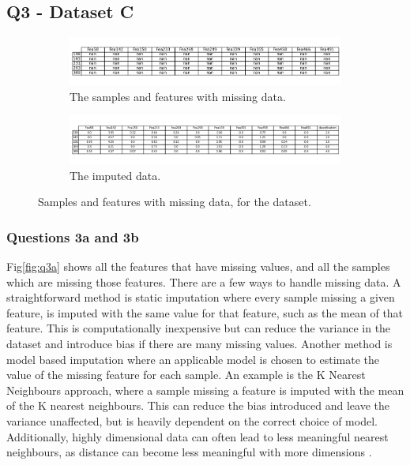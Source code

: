 
\subsection{Q3 - Dataset C}\label{subsec:dataset-c}
    \begin{figure}
    \centering
    \begin{subfigure}{0.9\textwidth}
        \centering
        \includegraphics[width=1\textwidth]{./figures/q3a}
        \caption{The samples and features with missing data.}
        \label{fig:q3a}
    \end{subfigure}%
    \hfill
    \begin{subfigure}{0.9\textwidth}
        \centering
        \includegraphics[width=1\textwidth]{./figures/q3c_1}
        \caption{The imputed data.}
        \label{fig:q3c}
    \end{subfigure}
    \caption{Samples and features with missing data, for the  dataset.}
    \label{fig:q3ac}
    \end{figure}

\subsubsection{Questions 3a and 3b}\label{subsubsec:q3ab}
    Fig\eqref{fig:q3a} shows all the features that have missing values, and all the samples which are missing
    those features.
    There are a few ways to handle missing data.
    A straightforward method is static imputation where every sample missing a given feature, is imputed with the same
    value for that feature, such as the mean of that feature.
    This is computationally inexpensive but can reduce the variance in the dataset and introduce bias if there are many
    missing values.
    Another method is model based imputation where an applicable model is chosen to estimate the value of the missing
    feature for each sample.
    An example is the K Nearest Neighbours approach, where a sample missing a feature is imputed with the mean of the
    K nearest neighbours.
    This can reduce the bias introduced and leave the variance unaffected, but is heavily dependent on the correct
    choice of model.
    Additionally, highly dimensional data can often lead to less meaningful nearest neighbours, as distance can become
    less meaningful with more dimensions \cite{bellman1957}.

